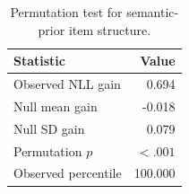 \begin{table}[htbp]
\centering
\caption{Permutation test for semantic-prior item structure.}
\label{tab:permutation}
\begin{tabular}{l r}
\toprule
Statistic & Value \\
\midrule
Observed NLL gain & 0.694 \\
Null mean gain & -0.018 \\
Null SD gain & 0.079 \\
Permutation $p$ & $<.001$ \\
Observed percentile & 100.000 \\
\bottomrule
\end{tabular}
\end{table}
